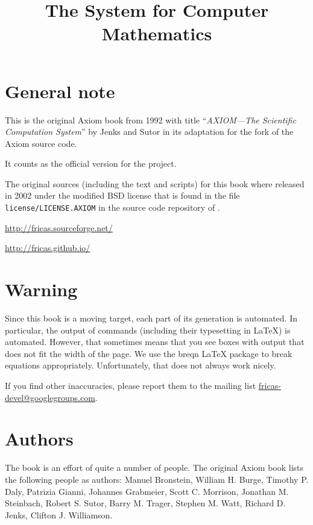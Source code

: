 \documentclass[twoside,a4paper]{book}
\title{The \Language{} System for Computer Mathematics}
\begin{document}
\maketitle
{}%
\setcounter{page}{0}


\section*{General note}
This is the original Axiom book from 1992 with title %
``\emph{AXIOM---The Scientific Computation System}'' by Jenks and
Sutor in its adaptation for the \Language{} fork of the Axiom source
code.

It counts as the official version for the \Language{} project.

The original sources (including the text and scripts) for this book
where released in 2002 under the modified BSD license that is found in
the file \texttt{license/LICENSE.AXIOM} in the source code repository
of \Language{}.

\url{http://fricas.sourceforge.net/}

\url{http://fricas.github.io/}


\section*{Warning}
Since this book is a moving target, each part of its generation is
automated. In particular, the output of \Language{} commands
(including their typesetting in \LaTeX{}) is automated. However, that
sometimes means that you see boxes with output that does not fit the
width of the page. We use the breqn \LaTeX{} package to break
equations appropriately. Unfortunately, that does not always work
nicely.

If you find other inaccuracies, please report them to the mailing list
\href{mailto:fricas-devel@googlegroups.com}{fricas-devel@googlegroups.com}.

\section*{Authors}

The book is an effort of quite a number of people.
%
The original Axiom book lists the following people as authors:
Manuel Bronstein,
William H. Burge,
Timothy P. Daly,
Patrizia Gianni,
Johannes Grabmeier,
Scott C. Morrison,
Jonathan M. Steinbach,
Robert S. Sutor,
Barry M. Trager,
Stephen M. Watt,
Richard D. Jenks,
Clifton J. Williamson.
\end{document}
